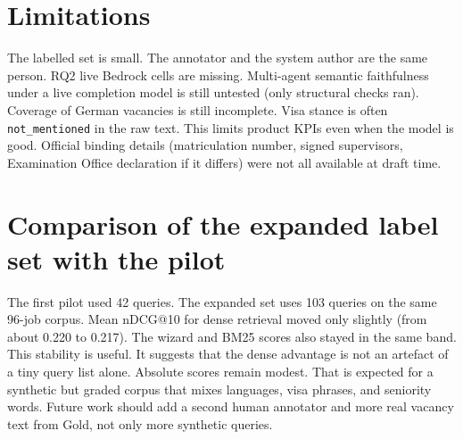 \section{Limitations}
\label{sec:limitations}

The labelled set is small. The annotator and the system author are the same person. RQ2 live Bedrock cells are missing. Multi-agent semantic faithfulness under a live completion model is still untested (only structural checks ran). Coverage of German vacancies is still incomplete. Visa stance is often \texttt{not\_mentioned} in the raw text. This limits product KPIs even when the model is good. Official binding details (matriculation number, signed supervisors, Examination Office declaration if it differs) were not all available at draft time.

\section{Comparison of the expanded label set with the pilot}
\label{sec:label-scale}

The first pilot used 42 queries. The expanded set uses 103 queries on the same 96-job corpus. Mean nDCG@10 for dense retrieval moved only slightly (from about 0.220 to 0.217). The wizard and BM25 scores also stayed in the same band. This stability is useful. It suggests that the dense advantage is not an artefact of a tiny query list alone. Absolute scores remain modest. That is expected for a synthetic but graded corpus that mixes languages, visa phrases, and seniority words. Future work should add a second human annotator and more real vacancy text from Gold, not only more synthetic queries.

